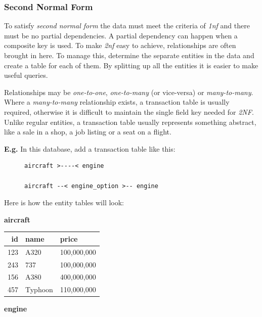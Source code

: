 \documentclass[10pt]{article}
\begin{document}
\subsubsection{Second Normal Form}
\label{sec:orgf958767}

To satisfy \emph{second normal form} the data must meet  the criteria of \emph{1nf} and there must be no partial dependencies. A partial dependency can happen when a composite key is used. To make \emph{2nf} easy to achieve, relationships are often brought in here. To manage this, determine the separate entities in the data and create a table for each of them. By splitting up all the entities it is easier to make useful queries.

Relationships may be \emph{one-to-one}, \emph{one-to-many} (or vice-versa) or \emph{many-to-many}. Where a \emph{many-to-many} relationship exists, a transaction table is usually required, otherwise it is difficult to maintain the single field key needed for \emph{2NF}. Unlike regular entities, a transaction table usually represents something abstract, like a sale in a shop, a job listing or a seat on a flight.

\textbf{E.g.} In this database, add a transaction table like this:

\begin{figure}[H]
\begin{verbatim}
aircraft >----< engine

aircraft --< engine_option >-- engine
\end{verbatim}
\end{figure}

Here is how the entity tables will look:

\textbf{aircraft}

\begin{center}
\begin{tabular}{rll}
\hline
id & name & price\\
\hline
123 & A320 & 100,000,000\\
243 & 737 & 100,000,000\\
156 & A380 & 400,000,000\\
457 & Typhoon & 110,000,000\\
\hline
\end{tabular}
\end{center}

\textbf{engine}
\end{document}
